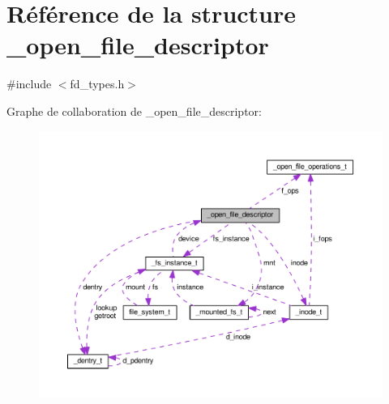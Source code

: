 \hypertarget{struct__open__file__descriptor}{\section{Référence de la structure \+\_\+open\+\_\+file\+\_\+descriptor}
\label{struct__open__file__descriptor}
}


{\ttfamily \#include $<$fd\+\_\+types.\+h$>$}



Graphe de collaboration de \+\_\+open\+\_\+file\+\_\+descriptor\+:
\nopagebreak
\begin{figure}[H]
\begin{center}
\leavevmode
\includegraphics[width=350pt]{struct__open__file__descriptor__coll__graph}
\end{center}
\end{figure}
